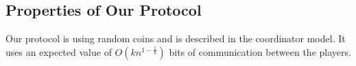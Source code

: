 \documentclass{article}
\newcommand{\TODO}[1]{ {\color{red} #1 }}
\newcommand{\rv}[1]{\mathbf{#1}}
\theoremstyle{plain}
\begin{document}
%
%
%





\subsection{Properties of Our Protocol}
Our protocol is using random coins and is described in the coordinator model. It uses an expected value of $O(kn^{1-\frac{1}{k}})$ bits of communication between the players.
\end{document}

